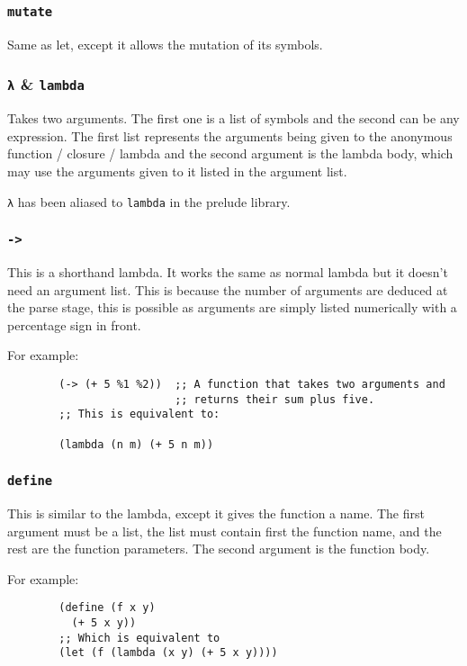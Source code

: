 \documentclass{article}
\newcommand{\code}[1]{\texttt{#1}}
\begin{document}
    \subsubsection{\code{mutate}}
      Same as let, except it allows the mutation of its symbols.

    \subsubsection{\code{λ} \& \code{lambda}}
      Takes two arguments. The first one is a list of symbols
      and the second can be any expression. The first list represents
      the arguments being given to the anonymous function / closure / lambda
      and the second argument is the lambda body, which may use the arguments
      given to it listed in the argument list.

      \code{λ} has been aliased to \code{lambda} in the prelude
      library.

    \subsubsection{\code{->}}
      This is a shorthand lambda. It works the same as normal lambda but
      it doesn't need an argument list. This is because the number of
      arguments are deduced at the parse stage, this is possible as
      arguments are simply listed numerically with a percentage sign
      in front.

      For example:

      \begin{verbatim}
        (-> (+ 5 %1 %2))  ;; A function that takes two arguments and
                          ;; returns their sum plus five.
        ;; This is equivalent to:

        (lambda (n m) (+ 5 n m))
      \end{verbatim}

    \subsubsection{\code{define}}
    This is similar to the lambda, except it gives the function a name.
    The first argument must be a list, the list must contain first
    the function name, and the rest are the function parameters.
    The second argument is the function body.

    For example:
      \begin{verbatim}
        (define (f x y)
          (+ 5 x y))
        ;; Which is equivalent to
        (let (f (lambda (x y) (+ 5 x y))))
      \end{verbatim}
\end{document}
